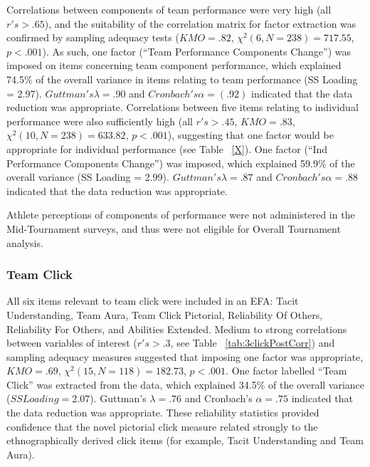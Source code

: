\begin{CJK}{UTF8}{gbsn}
Correlations between components of team performance were very high (all $r's > .65$), and the suitability of the correlation matrix for factor extraction was confirmed by sampling adequacy tests ($KMO = .82$, $\chi^2(6, N = 238) = 717.55$, $p < .001$).  As such, one factor (``Team Performance Components Change'') was imposed on items concerning team component performance, which explained 74.5\% of the overall variance in items relating to team performance (SS Loading = 2.97). $Guttman's \lambda =.90$ and $Cronbach's \alpha = (.92)$ indicated that the data reduction was appropriate.  Correlations between five items relating to individual performance were also sufficiently high (all $r's > .45$, $KMO = .83$, $\chi^2(10, N = 238) = 633.82$, $p < .001$), suggesting that one factor would be appropriate for individual performance (see Table ~\ref{X}).  One factor (``Ind Performance Components Change'') was imposed, which explained 59.9\% of the overall variance (SS Loading = 2.99).  $Guttman's\lambda =.87$ and $Cronbach's \alpha = .88$ indicated that the data reduction was appropriate.



Athlete perceptions of components of performance were not administered in the Mid-Tournament surveys, and thus were not eligible for Overall Tournament analysis.









\subsubsection{Team Click}

All six items relevant to team click were included in an EFA: Tacit Understanding, Team Aura, Team Click Pictorial, Reliability Of Others, Reliability For Others, and Abilities Extended.  Medium to strong correlations between variables of interest ($r's > .3$, see Table ~\ref{tab:3clickPostCorr}) and sampling adequacy measures suggested that imposing one factor was appropriate, $KMO =  .69$, $\chi^2(15, N = 118) = 182.73$, $p < .001$.  One factor labelled ``Team Click'' was extracted from the data, which explained 34.5\% of the overall variance ($SS Loading = 2.07$).  Guttman's $\lambda =.76$ and Cronbach's $\alpha = .75$ indicated that the data reduction was appropriate.  These reliability statistics provided confidence that the novel pictorial click measure related strongly to the ethnographically derived click items (for example, Tacit Understanding and Team Aura).



\end{CJK}
